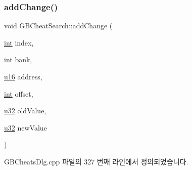 \subsubsection{\texorpdfstring{add\+Change()}{addChange()}}
{\footnotesize\ttfamily void G\+B\+Cheat\+Search\+::add\+Change (\begin{DoxyParamCaption}\item[{\mbox{\hyperlink{_util_8cpp_a0ef32aa8672df19503a49fab2d0c8071}{int}}}]{index,  }\item[{\mbox{\hyperlink{_util_8cpp_a0ef32aa8672df19503a49fab2d0c8071}{int}}}]{bank,  }\item[{\mbox{\hyperlink{_system_8h_a9e6c91d77e24643b888dbd1a1a590054}{u16}}}]{address,  }\item[{\mbox{\hyperlink{_util_8cpp_a0ef32aa8672df19503a49fab2d0c8071}{int}}}]{offset,  }\item[{\mbox{\hyperlink{_system_8h_a10e94b422ef0c20dcdec20d31a1f5049}{u32}}}]{old\+Value,  }\item[{\mbox{\hyperlink{_system_8h_a10e94b422ef0c20dcdec20d31a1f5049}{u32}}}]{new\+Value }\end{DoxyParamCaption})}



G\+B\+Cheats\+Dlg.\+cpp 파일의 327 번째 라인에서 정의되었습니다.


